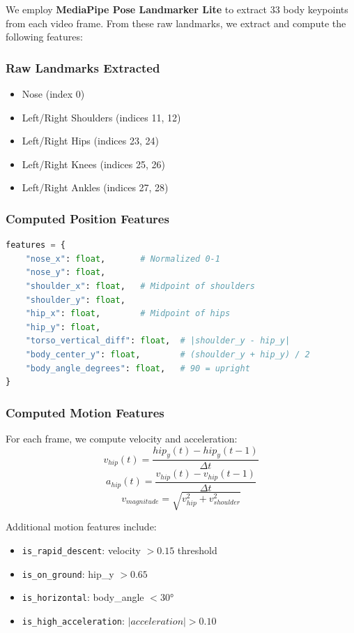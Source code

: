 \documentclass[conference]{IEEEtran}
\begin{document}
We employ \textbf{MediaPipe Pose Landmarker Lite} to extract 33 body keypoints from each video frame. From these raw landmarks, we extract and compute the following features:

\subsubsection{Raw Landmarks Extracted}
\begin{itemize}[leftmargin=*]
    \item Nose (index 0)
    \item Left/Right Shoulders (indices 11, 12)
    \item Left/Right Hips (indices 23, 24)
    \item Left/Right Knees (indices 25, 26)
    \item Left/Right Ankles (indices 27, 28)
\end{itemize}

\subsubsection{Computed Position Features}
\begin{lstlisting}[language=Python]
features = {
    "nose_x": float,       # Normalized 0-1
    "nose_y": float,
    "shoulder_x": float,   # Midpoint of shoulders
    "shoulder_y": float,
    "hip_x": float,        # Midpoint of hips
    "hip_y": float,
    "torso_vertical_diff": float,  # |shoulder_y - hip_y|
    "body_center_y": float,        # (shoulder_y + hip_y) / 2
    "body_angle_degrees": float,   # 90 = upright
}
\end{lstlisting}

\subsubsection{Computed Motion Features}
For each frame, we compute velocity and acceleration:
\begin{equation}
    v_{hip}(t) = \frac{hip_y(t) - hip_y(t-1)}{\Delta t}
\end{equation}
\begin{equation}
    a_{hip}(t) = \frac{v_{hip}(t) - v_{hip}(t-1)}{\Delta t}
\end{equation}
\begin{equation}
    v_{magnitude} = \sqrt{v_{hip}^2 + v_{shoulder}^2}
\end{equation}

Additional motion features include:
\begin{itemize}[leftmargin=*]
    \item \texttt{is\_rapid\_descent}: velocity $> 0.15$ threshold
    \item \texttt{is\_on\_ground}: hip\_y $> 0.65$
    \item \texttt{is\_horizontal}: body\_angle $< 30°$
    \item \texttt{is\_high\_acceleration}: $|acceleration| > 0.10$
\end{itemize}
\end{document}
